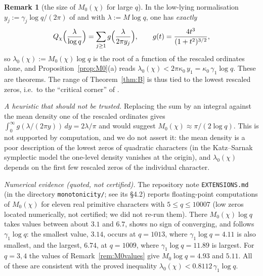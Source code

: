 \documentclass[11pt]{amsart}
\theoremstyle{definition}
\newtheorem{remark}[theorem]{Remark}
\numberwithin{equation}{section}
\begin{document}
\begin{remark}[the size of $M_0(\chi)$ for large $q$]\label{rem:corner}
In the low-lying normalisation $y_j:=\gamma_j\log q/(2\pi)$ of
\cite[Remark~10]{WR} and with $\lambda:=M\log q$, one has
\emph{exactly}
\[
Q_\chi\Bigl(\frac{\lambda}{\log q}\Bigr)
=\sum_{j\ge1}g\Bigl(\frac{\lambda}{2\pi y_j}\Bigr),
\qquad g(t)=\frac{4t^3}{(1+t^2)^{3/2}} ,
\]
so $\lambda_0(\chi):=M_0(\chi)\log q$ is the root of a function of the
rescaled ordinates alone, and Proposition~\ref{prop:M0}(a) reads
$\lambda_0(\chi)<2\pi\kappa_0\,y_1=\kappa_0\,\gamma_1\log q$. These are
theorems. The range of Theorem~\ref{thm:B} is thus tied to the lowest
rescaled zeros, i.e.\ to the ``critical corner'' of
\cite[Remarks~9 and~10]{WR}.

\emph{A heuristic that should not be trusted.} Replacing the sum by
an integral against the mean density one of the rescaled ordinates
gives $\int_0^\infty g(\lambda/(2\pi y))\,dy=2\lambda/\pi$ and would
suggest $M_0(\chi)\approx\pi/(2\log q)$. This is not supported by
computation, and we do not assert it: the mean density is a poor
description of the lowest zeros of quadratic characters (in the
Katz--Sarnak symplectic model \cite{KS99} the one-level density
vanishes at the origin), and $\lambda_0(\chi)$ depends on the first
few rescaled zeros of the individual character.

\emph{Numerical evidence (quoted, not certified).} The repository
note \texttt{EXTENSIONS.md} (in the directory \texttt{monotonicity/};
see its \S4.2) reports floating-point computations of $M_0(\chi)$ for eleven real primitive characters with
$5\le q\le10007$ (low zeros located numerically, not certified; we
did not re-run them). There $M_0(\chi)\log q$ takes values between
about $3.1$ and $6.7$, shows no sign of converging, and follows
$\gamma_1\log q$: the smallest value, $3.14$, occurs at $q=1013$,
where $\gamma_1\log q=4.11$ is also smallest, and the largest,
$6.74$, at $q=1009$, where $\gamma_1\log q=11.89$ is largest. For
$q=3,4$ the values of Remark~\ref{rem:M0values} give
$M_0\log q=4.93$ and $5.11$. All of these are consistent with the
proved inequality $\lambda_0(\chi)<0.8112\,\gamma_1\log q$.


\end{remark}
\end{document}
